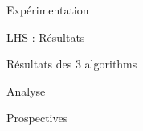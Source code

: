 \begin{frame}{Expérimentation}
    
\end{frame}

\begin{frame}{LHS : Résultats}
    
\end{frame}

\begin{frame}{Résultats des 3 algorithms}
    
\end{frame}

\begin{frame}{Analyse}
    
\end{frame}

\begin{frame}{Prospectives}
    
\end{frame}